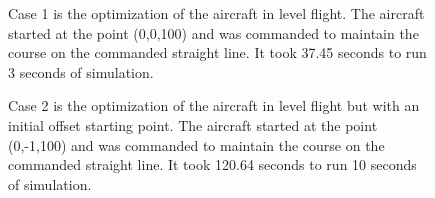 \documentclass[letterpaper, 10 pt, conference]{ieeeconf}  %
\begin{document}
	\begin{figure}[htbp]
		\centering
		\qquad
		\caption{Case 1 is the optimization of the aircraft in level flight. The aircraft started at the point (0,0,100) and was commanded to maintain the course on the commanded straight line. It took 37.45 seconds to run 3 seconds of simulation.}
		\label{fig:fw_level}
	\end{figure}
	
	\begin{figure}[htbp]
		\centering
		\qquad
		\caption{Case 2 is the optimization of the aircraft in level flight but with an initial offset starting point. The aircraft started at the point (0,-1,100) and was commanded to maintain the course on the commanded straight line. It took 120.64 seconds to run 10 seconds of simulation.}
		\label{fig:fw_offset}
	\end{figure}
	
\end{document}
